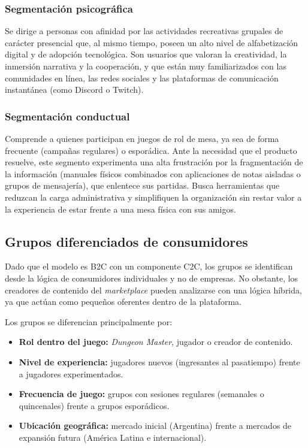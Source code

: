 \subsubsection{Segmentación psicográfica}
Se dirige a personas con afinidad por las actividades recreativas grupales de carácter presencial que, al mismo tiempo, poseen un alto nivel de alfabetización digital y de adopción tecnológica. Son usuarios que valoran la creatividad, la inmersión narrativa y la cooperación, y que están muy familiarizados con las comunidades en línea, las redes sociales y las plataformas de comunicación instantánea (como Discord o Twitch).

\subsubsection{Segmentación conductual}
Comprende a quienes participan en juegos de rol de mesa, ya sea de forma frecuente (campañas regulares) o esporádica. Ante la necesidad que el producto resuelve, este segmento experimenta una alta frustración por la fragmentación de la información (manuales físicos combinados con aplicaciones de notas aisladas o grupos de mensajería), que enlentece sus partidas. Busca herramientas que reduzcan la carga administrativa y simplifiquen la organización sin restar valor a la experiencia de estar frente a una mesa física con sus amigos.

\subsection{Grupos diferenciados de consumidores}
Dado que el modelo es B2C con un componente C2C, los grupos se identifican desde la lógica de consumidores individuales y no de empresas. No obstante, los creadores de contenido del \textit{marketplace} pueden analizarse con una lógica híbrida, ya que actúan como pequeños oferentes dentro de la plataforma.

Los grupos se diferencian principalmente por:
\begin{itemize}
  \item \textbf{Rol dentro del juego:} \textit{Dungeon Master}, jugador o creador de contenido.
  \item \textbf{Nivel de experiencia:} jugadores nuevos (ingresantes al pasatiempo) frente a jugadores experimentados.
  \item \textbf{Frecuencia de juego:} grupos con sesiones regulares (semanales o quincenales) frente a grupos esporádicos.
  \item \textbf{Ubicación geográfica:} mercado inicial (Argentina) frente a mercados de expansión futura (América Latina e internacional).
\end{itemize}

